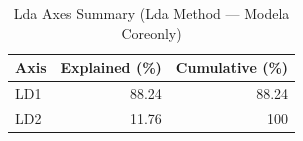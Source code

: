 \begin{table}[htbp]
  \centering
  \caption{Lda Axes Summary (Lda Method — Modela Coreonly)}
  \label{tab:LDA_Method_ModelA_CoreOnly_tables_lda_axes_summary}
  \begin{tabular}{lrr}
    \toprule
    Axis & Explained (\%) & Cumulative (\%) \\
    \midrule
    LD1 & 88.24 & 88.24 \\
    LD2 & 11.76 & 100 \\
    \bottomrule
  \end{tabular}
\end{table}
